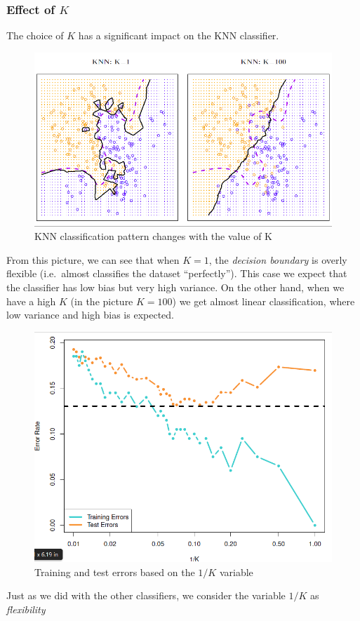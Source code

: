 \documentclass[11pt]{article}
\makeatletter
\def\maxwidth{\ifdim\Gin@nat@width>\linewidth\linewidth
    \else\Gin@nat@width\fi}
\let\Oldincludegraphics\includegraphics
\renewcommand{\includegraphics}[1]{\Oldincludegraphics[width=.8\maxwidth]{#1}}
\makeatother
\begin{document}
    \hypertarget{effect-of-k}{%
\subsubsection{\texorpdfstring{Effect of
\(K\)}{Effect of K}}\label{effect-of-k}}

The choice of \(K\) has a significant impact on the KNN classifier.

\begin{figure}[h!]
    \centering
    \includegraphics{knn_k_comparison.png}
    \caption{KNN classification pattern changes with the value of K}
\end{figure}

From this picture, we can see that when \(K=1\), the \emph{decision
boundary} is overly flexible (i.e.~almost classifies the dataset
``perfectly''). This case we expect that the classifier has low bias but
very high variance. On the other hand, when we have a high \(K\) (in the
picture \(K=100\)) we get almost linear classification, where low
variance and high bias is expected.


\begin{figure}[h!]
    \centering
    \includegraphics{knn_flexibility.png}
    \caption{Training and test errors based on the $1/K$ variable}
\end{figure}
Just as we did with the other classifiers, we consider the variable
\(1/K\) as \emph{flexibility}
\end{document}

